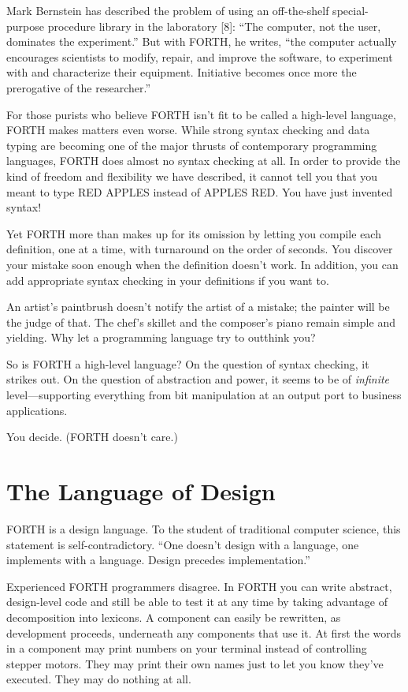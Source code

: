 Mark Bernstein has described the problem of using an off-the-shelf
special-purpose procedure library in the laboratory {[}8{]}: {}``The
computer, not the user, dominates the experiment.'' But with FORTH,
he writes, {}``the computer actually encourages scientists to modify,
repair, and improve the software, to experiment with and characterize
their equipment. Initiative becomes once more the prerogative of the
researcher.''


For those purists who believe FORTH isn't fit to be called a high-level
language, FORTH makes matters even worse. While strong syntax checking
and data typing are becoming one of the major thrusts of contemporary
programming languages, FORTH does almost no syntax checking at all.
In order to provide the kind of freedom and flexibility we have described,
it cannot tell you that you meant to type RED APPLES instead of APPLES
RED. You have just invented syntax!

Yet FORTH more than makes up for its omission by letting you compile
each definition, one at a time, with turnaround on the order of seconds.
You discover your mistake soon enough when the definition doesn't
work. In addition, you can add appropriate syntax checking in your
definitions if you want to.

An artist's paintbrush doesn't notify the artist of a mistake; the
painter will be the judge of that. The chef's skillet and the composer's
piano remain simple and yielding. Why let a programming language try
to outthink you?

So is FORTH a high-level language? On the question of syntax checking,
it strikes out. On the question of abstraction and power, it seems
to be of \emph{infinite} level---supporting everything from bit manipulation
at an output port to business applications.

You decide. (FORTH doesn't care.)


\section{The Language of Design}

FORTH is a design language. To the student of traditional computer
science, this statement is self-contradictory. {}``One doesn't design
with a language, one implements with a language. Design precedes implementation.''

Experienced FORTH programmers disagree. In FORTH you can write abstract,
design-level code and still be able to test it at any time by taking
advantage of decomposition into lexicons. A component can easily be
rewritten, as development proceeds, underneath any components that
use it. At first the words in a component may print numbers on your
terminal instead of controlling stepper motors. They may print their
own names just to let you know they've executed. They may do nothing
at all.

